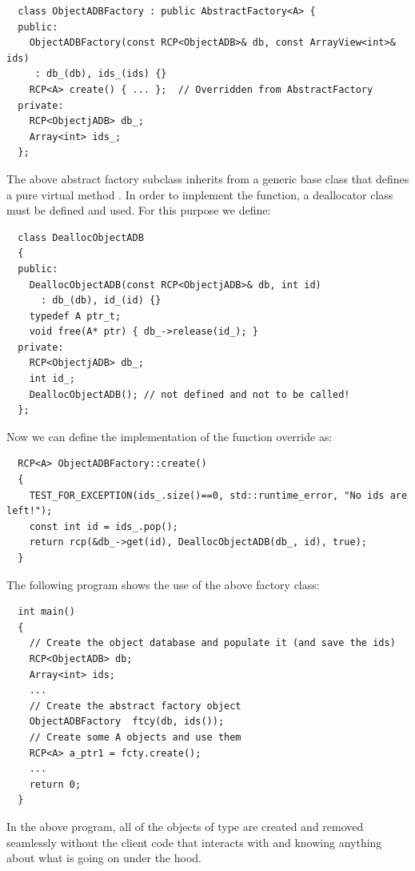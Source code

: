 \documentclass[pdf,ps2pdf,11pt]{SANDreport}
\begin{document}
{\small\begin{verbatim}
  class ObjectADBFactory : public AbstractFactory<A> {
  public:
    ObjectADBFactory(const RCP<ObjectADB>& db, const ArrayView<int>& ids)
     : db_(db), ids_(ids) {}
    RCP<A> create() { ... };  // Overridden from AbstractFactory
  private:
    RCP<ObjectjADB> db_;
    Array<int> ids_;
  };
\end{verbatim}}

The above abstract factory subclass {}
inherits from a generic {} base class that
defines a pure virtual method {}.  In order to
implement the {} function, a deallocator class must
be defined and used.  For this purpose we define:

{\small\begin{verbatim}
  class DeallocObjectADB
  {
  public:
    DeallocObjectADB(const RCP<ObjectjADB>& db, int id)
      : db_(db), id_(id) {}
    typedef A ptr_t;
    void free(A* ptr) { db_->release(id_); }
  private:
    RCP<ObjectjADB> db_;
    int id_;
    DeallocObjectADB(); // not defined and not to be called!
  };
\end{verbatim}}

Now we can define the implementation of the {}
function override as:

{\small\begin{verbatim}
  RCP<A> ObjectADBFactory::create()
  {
    TEST_FOR_EXCEPTION(ids_.size()==0, std::runtime_error, "No ids are left!");
    const int id = ids_.pop();
    return rcp(&db_->get(id), DeallocObjectADB(db_, id), true);
  }
\end{verbatim}}

The following program shows the use of the above factory class:

{\small\begin{verbatim}
  int main()
  {
    // Create the object database and populate it (and save the ids)
    RCP<ObjectADB> db;
    Array<int> ids;
    ...
    // Create the abstract factory object
    ObjectADBFactory  ftcy(db, ids());
    // Create some A objects and use them
    RCP<A> a_ptr1 = fcty.create();
    ...
    return 0;
  }
\end{verbatim}}

In the above program, all of the objects of type {} are
created and removed seamlessly without the client code that interacts
with {} and {} knowing anything
about what is going on under the hood.
\end{document}
